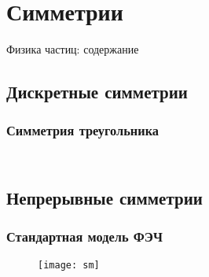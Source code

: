 \section{Симметрии}
\begin{frame}{Физика частиц: содержание}
    \tableofcontents[currentsection, subsectionstyle=show/show/hide]
\end{frame}
\subsection{Дискретные симметрии}
\begin{frame}
    \frametitle{Симметрия треугольника}
    \begin{columns}
        \begin{column}{0.3\textwidth}
            \begin{figure}[H]
                \begin{centering}
                    
                \end{centering}
            \end{figure}
        \end{column}
        \begin{column}{0.3\textwidth}
        \end{column}
        \begin{column}{0.3\textwidth}
        \end{column}
    \end{columns}
\end{frame}

\subsection{Непрерывные симметрии}
\begin{frame}
    \frametitle{Стандартная модель ФЭЧ}
    \begin{figure}
        \begin{centering}
            \texttt{[image: sm]}
        \end{centering}
    \end{figure}
\end{frame}
